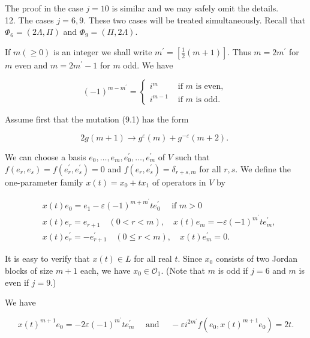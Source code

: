 \documentclass[10pt]{article}
\begin{document}
The proof in the case $j=10$ is similar and we may safely omit the details.\\
12. The cases $j=6,9$. These two cases will be treated simultaneously. Recall that $\Phi_{6}=(2 \Lambda, \Pi)$ and $\Phi_{9}=(\Pi, 2 \Lambda)$.

If $m(\geqslant 0)$ is an integer we shall write $m^{\prime}=\left[\frac{1}{2}(m+1)\right]$. Thus $m=2 m^{\prime}$ for $m$ even and $m=2 m^{\prime}-1$ for $m$ odd. We have


\begin{equation*}
(-1)^{m-m^{\prime}}= \begin{cases}i^{m} & \text { if } m \text { is even, } \\ i^{m-1} & \text { if } m \text { is odd. }\end{cases} \tag{12.1}
\end{equation*}


Assume first that the mutation (9.1) has the form


\begin{equation*}
2 g(m+1) \rightarrow g^{\varepsilon}(m)+g^{-\varepsilon}(m+2) \text {. } \tag{12.2}
\end{equation*}


We can choose a basis $e_{0}, \ldots, e_{m}, e_{0}^{\prime}, \ldots, e_{m}^{\prime}$ of $V$ such that $f\left(e_{r}, e_{s}\right)=f\left(e_{r}^{\prime}, e_{s}^{\prime}\right)=0$ and $f\left(e_{r}, e_{s}^{\prime}\right)=\delta_{r+s, m}$ for all $r, s$. We define the one-parameter family $x(t)=x_{0}+t x_{1}$ of operators in $V$ by

$$
\begin{aligned}
& x(t) e_{0}=e_{1}-\varepsilon(-1)^{m+m^{\prime}} t e_{0}^{\prime} \quad \text { if } m>0 \\
& x(t) e_{r}=e_{r+1} \quad(0<r<m), \quad x(t) e_{m}=-\varepsilon(-1)^{m^{\prime}} t e_{m}^{\prime}, \\
& x(t) e_{r}^{\prime}=-e_{r+1}^{\prime} \quad(0 \leqslant r<m), \quad x(t) e_{m}^{\prime}=0 .
\end{aligned}
$$

It is easy to verify that $x(t) \in L$ for all real $t$. Since $x_{0}$ consists of two Jordan blocks of size $m+1$ each, we have $x_{0} \in \mathcal{O}_{1}$. (Note that $m$ is odd if $j=6$ and $m$ is even if $j=9$.)

We have


\begin{equation*}
x(t)^{m+1} e_{0}=-2 \varepsilon(-1)^{m^{\prime}} t e_{m}^{\prime} \quad \text { and } \quad-\varepsilon i^{2 m^{\prime}} f\left(e_{0}, x(t)^{m+1} e_{0}\right)=2 t . \tag{12.3}
\end{equation*}
\end{document}
